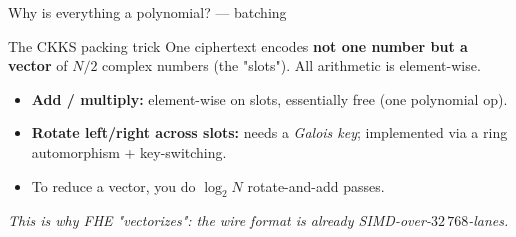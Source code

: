 \documentclass[aspectratio=169]{beamer}
\begin{document}
\begin{frame}{Why is everything a polynomial? — batching}
  \begin{block}{The CKKS packing trick}
    One ciphertext encodes \textbf{not one number but a vector} of
    $N/2$ complex numbers (the "slots"). All arithmetic is element-wise.
  \end{block}
  \vspace{0.3em}
  \begin{center}
  \end{center}
  \vspace{0.3em}
  \begin{itemize}\small
    \item \textbf{Add / multiply:} element-wise on slots, essentially free
          (one polynomial op).
    \item \textbf{Rotate left/right across slots:} needs a \emph{Galois key};
          implemented via a ring automorphism + key-switching.
    \item To reduce a vector, you do $\log_2 N$ rotate-and-add passes.
  \end{itemize}
  \vspace{0.3em}
  \emph{This is why FHE "vectorizes": the wire format is already SIMD-over-$32\,768$-lanes.}
\end{frame}
\end{document}
